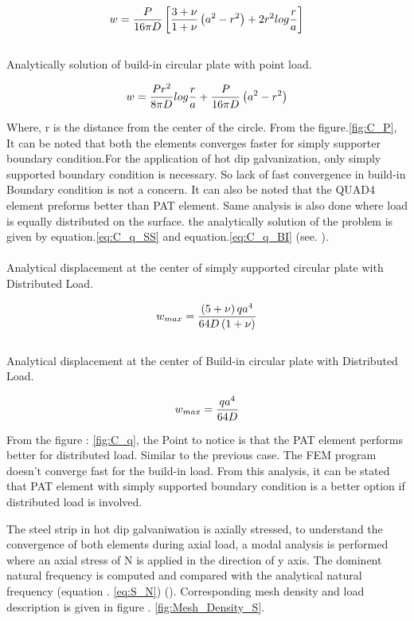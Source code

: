 \documentclass[main.tex]{subfiles}
\begin{document}
\begin{equation}{\label{eq:C_P_SS}}
w=\frac{P}{16 \pi D} \left[\frac{3+\nu}{1+\nu}\left(a^2-r^2\right)+2r^2log\frac{r}{a}\right]
\end{equation}
\\
Analytically solution of build-in circular plate with point load.

\begin{equation}{\label{eq:C_P_BI}}
w=\frac{Pr^2}{8 \pi D} log\frac{r}{a}+\frac{P}{16 \pi D} \left(a^2 - r^2 \right)
\end{equation}\par
Where, r is the distance from the center of the circle. From the figure.\ref{fig:C_P}, It can be noted that both the elements converges faster for simply supporter boundary condition.For the application of hot dip galvanization, only simply supported boundary condition is necessary. So lack of fast convergence in build-in Boundary condition is not a concern. It can also be noted that the QUAD4 element preforms better than PAT element. Same analysis is also done where load is equally distributed on the surface. the analytically solution of the problem is given by equation.\ref{eq:C_q_SS} and equation.\ref{eq:C_q_BI} (see. \cite{TIMOPLATES}).
\\
\\
Analytical displacement at the center of simply supported circular plate with Distributed Load.

\begin{equation}{\label{eq:C_q_SS}}
w_{max}=\frac{\left(5+\nu\right)qa^4}{64 D \left(1+\nu\right)} 
\end{equation}
\\
Analytical displacement at the center of Build-in circular plate with Distributed Load.

\begin{equation}{\label{eq:C_q_BI}}
w_{max}=\frac{qa^4}{64 D} 
\end{equation}
\par
From the figure : \ref{fig:C_q}, the Point to notice is that the PAT element performs better for distributed load. Similar to the previous case. The FEM program doesn't converge fast for the build-in load. From this analysis, it can be stated that PAT element with simply supported boundary condition is a better option if distributed load is involved.  \par

The steel strip in hot dip galvaniwation is axially stressed, to understand the convergence of both elements during axial load, a modal analysis is performed where an axial stress of N is applied in the direction of y axis. The dominent natural frequency is computed and compared with the analytical natural frequency (equation . \ref{eq:S_N}) (\cite{LEISSA_NASA}). Corresponding mesh density and load description is given in figure . \ref{fig:Mesh_Density_S}. 
\end{document}

